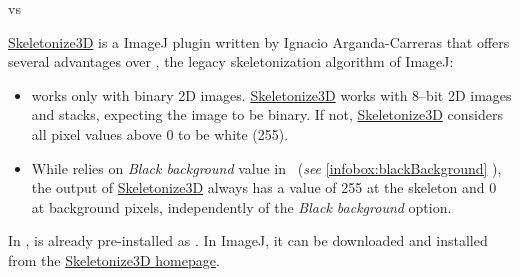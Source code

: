 \begin{infobox}
\caption{\label{infobox:Skeletonize-vs-Skeletonize3D}\protect{}
vs \protect{}}


\href{http://fiji.sc/wiki/index.php/Skeletonize3D}{Skeletonize3D}
is a ImageJ plugin written by Ignacio Arganda-Carreras \cite{C-Skeletonize3D}
that offers several advantages over ,
the legacy skeletonization algorithm of ImageJ:
\begin{itemize}
\item {} works only with binary
2D images. \href{http://fiji.sc/wiki/index.php/Skeletonize3D}{Skeletonize3D}
works with 8--bit 2D images and stacks, expecting the image to be
binary. If not, \href{http://fiji.sc/wiki/index.php/Skeletonize3D}{Skeletonize3D}
considers all pixel values above 0 to be white (255). 
\item While  relies on \emph{Black
background} value in \ (\emph{see}
\ref{infobox:blackBackground} ),
the output of \href{http://fiji.sc/wiki/index.php/Skeletonize3D}{Skeletonize3D}
always has a value of 255 at the skeleton and 0 at background pixels,
independently of the \emph{Black background} option.
\end{itemize}
In ,  is already
pre-installed as .
In ImageJ, it can be downloaded and installed from the \href{http://fiji.sc/wiki/index.php/Skeletonize3D}{Skeletonize3D homepage}.\bigskip{}



\end{infobox}
